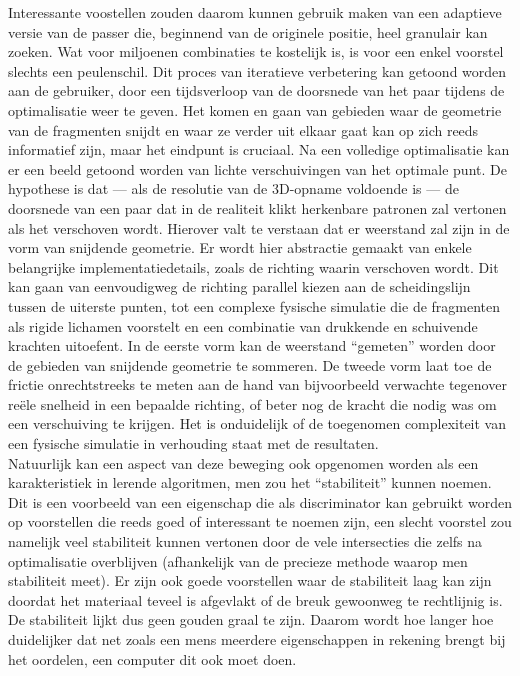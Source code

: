 Interessante voostellen zouden daarom kunnen gebruik maken van een adaptieve versie van de passer die, beginnend van de originele positie, heel granulair kan zoeken. Wat voor miljoenen combinaties te kostelijk is, is voor een enkel voorstel slechts een peulenschil. Dit proces van iteratieve verbetering kan getoond worden aan de gebruiker, door een tijdsverloop van de doorsnede van het paar tijdens de optimalisatie weer te geven. Het komen en gaan van gebieden waar de geometrie van de fragmenten snijdt en waar ze verder uit elkaar gaat kan op zich reeds informatief zijn, maar het eindpunt is cruciaal. Na een volledige optimalisatie kan er een beeld getoond worden van lichte verschuivingen van het optimale punt. De hypothese is dat --- als de resolutie van de 3D-opname voldoende is --- de doorsnede van een paar dat in de realiteit klikt herkenbare patronen zal vertonen als het verschoven wordt. Hierover valt te verstaan dat er weerstand zal zijn in de vorm van snijdende geometrie. Er wordt hier abstractie gemaakt van enkele belangrijke implementatiedetails, zoals de richting waarin verschoven wordt. Dit kan gaan van eenvoudigweg de richting parallel kiezen aan de scheidingslijn tussen de uiterste punten, tot een complexe fysische simulatie die de fragmenten als rigide lichamen voorstelt en een combinatie van drukkende en schuivende krachten uitoefent. In de eerste vorm kan de weerstand ``gemeten'' worden door de gebieden van snijdende geometrie te sommeren. De tweede vorm laat toe de frictie onrechtstreeks te meten aan de hand van bijvoorbeeld verwachte tegenover re\"ele snelheid in een bepaalde richting, of beter nog de kracht die nodig was om een verschuiving te krijgen. Het is onduidelijk of de toegenomen complexiteit van een fysische simulatie in verhouding staat met de resultaten.\\

 Natuurlijk kan een aspect van deze beweging ook opgenomen worden als een karakteristiek in lerende algoritmen, men zou het ``stabiliteit'' kunnen noemen. Dit is een voorbeeld van een eigenschap die als discriminator kan gebruikt worden op voorstellen die reeds goed of interessant te noemen zijn, een slecht voorstel zou namelijk veel stabiliteit kunnen vertonen door de vele intersecties die zelfs na optimalisatie overblijven (afhankelijk van de precieze methode waarop men stabiliteit meet). Er zijn ook goede voorstellen waar de stabiliteit laag kan zijn doordat het materiaal teveel is afgevlakt of de breuk gewoonweg te rechtlijnig is. De stabiliteit lijkt dus geen gouden graal te zijn. Daarom wordt hoe langer hoe duidelijker dat net zoals een mens meerdere eigenschappen in rekening brengt bij het oordelen, een computer dit ook moet doen.
 
